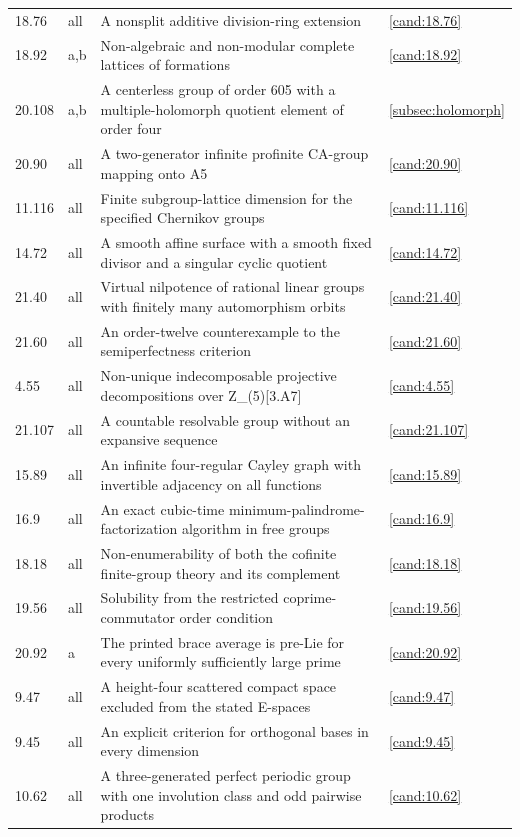 \begin{longtable}{@{}p{}p{}>{\raggedright\arraybackslash}p{}p{}@{}}
18.76 & all & A nonsplit additive division-ring extension & \ref{cand:18.76} \\
18.92 & a,b & Non-algebraic and non-modular complete lattices of formations & \ref{cand:18.92} \\
20.108 & a,b & A centerless group of order 605 with a multiple-holomorph quotient element of order four & \ref{subsec:holomorph} \\
20.90 & all & A two-generator infinite profinite CA-group mapping onto A5 & \ref{cand:20.90} \\
11.116 & all & Finite subgroup-lattice dimension for the specified Chernikov groups & \ref{cand:11.116} \\
14.72 & all & A smooth affine surface with a smooth fixed divisor and a singular cyclic quotient & \ref{cand:14.72} \\
21.40 & all & Virtual nilpotence of rational linear groups with finitely many automorphism orbits & \ref{cand:21.40} \\
21.60 & all & An order-twelve counterexample to the semiperfectness criterion & \ref{cand:21.60} \\
4.55 & all & Non-unique indecomposable projective decompositions over Z\_(5)[3.A7] & \ref{cand:4.55} \\
21.107 & all & A countable resolvable group without an expansive sequence & \ref{cand:21.107} \\
15.89 & all & An infinite four-regular Cayley graph with invertible adjacency on all functions & \ref{cand:15.89} \\
16.9 & all & An exact cubic-time minimum-palindrome-factorization algorithm in free groups & \ref{cand:16.9} \\
18.18 & all & Non-enumerability of both the cofinite finite-group theory and its complement & \ref{cand:18.18} \\
19.56 & all & Solubility from the restricted coprime-commutator order condition & \ref{cand:19.56} \\
20.92 & a & The printed brace average is pre-Lie for every uniformly sufficiently large prime & \ref{cand:20.92} \\
9.47 & all & A height-four scattered compact space excluded from the stated E-spaces & \ref{cand:9.47} \\
9.45 & all & An explicit criterion for orthogonal bases in every dimension & \ref{cand:9.45} \\
10.62 & all & A three-generated perfect periodic group with one involution class and odd pairwise products & \ref{cand:10.62} \\

\end{longtable}
